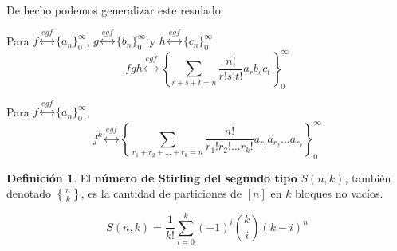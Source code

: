 \documentclass[spanish]{book}
\theoremstyle{definition}
\newtheorem*{defn}{Definición}
\DeclareRobustCommand{\stirling}{\genfrac\{\}{0pt}{}}
\begin{document}
De hecho podemos generalizar este resulado:
\begin{teo}	
	Para $f\overset{egf}{\longleftrightarrow}\{a_n\}_0^\infty$, $g\overset{egf}{\longleftrightarrow}\{b_n\}_0^\infty$ y $h\overset{egf}{\longleftrightarrow}\{c_n\}_0^\infty$
	\[fgh\overset{egf}{\longleftrightarrow}\left\{\sum_{r+s+t=n}\frac{n!}{r!s!t!}a_rb_sc_t\right\}_0^\infty\]
\end{teo}
\begin{teo}	
	Para $f\overset{egf}{\longleftrightarrow}\{a_n\}_0^\infty$,
	\[f^k\overset{egf}{\longleftrightarrow}\left\{\sum_{r_1+r_2+\ldots+r_k=n}\frac{n!}{r_1!r_2!\ldots r_k!}a_{r_1}a_{r_2}\ldots a_{r_k}\right\}_0^\infty\]
\end{teo}
\begin{defn}
	El \textbf{número de Stirling del segundo tipo} $S(n,k)$, también denotado $\stirling{n}{k}$, es la cantidad de particiones de $[n]$ en $k$ bloques no vacíos.
\end{defn}
\begin{teo}
	\[S(n,k)=\frac{1}{k!}\sum_{i=0}^k(-1)^i{k\choose i}(k-i)^n\]
\end{teo}
\end{document}

